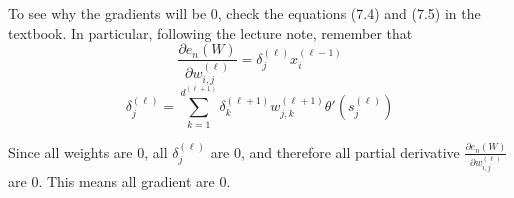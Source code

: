 \documentclass[10pt]{article}
\begin{document}
\begin{enumerate}
\begin{itemize}
To see why the gradients will be $0$, check the equations (7.4) and (7.5) in the textbook. 
In particular, following the lecture note, 
remember that 
\[ \frac{\partial e_n(W)}{\partial w_{i,j}^{(\ell)}} = \delta_j^{(\ell)} x_i^{(\ell-1)} \]
\[\delta_j^{(\ell)}=\sum_{k=1}^{d^{(\ell+1)}} \delta_k^{(\ell+1)} w_{j,k}^{(\ell+1)} \theta'(s_j^{(\ell)})\]

Since all weights are $0$, all $\delta_j^{(\ell)}$ are $0$, and therefore all partial derivative $\frac{\partial e_n(W)}{\partial w_{i,j}^{(\ell)}}$ are $0$. This means all gradient are $0$.
\end{itemize}



\end{enumerate}
 
\end{document}
